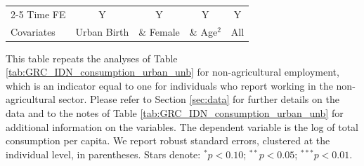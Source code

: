 \begin{table}[htbp]
\begin{threeparttable}
\begin{tabular}{l cccc}
\cmidrule{2-5} Time FE & Y & Y & Y & Y \\ Covariates & Urban Birth & \& Female & \& Age$^2$ & All \\ \bottomrule \end{tabular} \begin{tablenotes}[flushleft] \footnotesize \item{This table repeats the analyses of Table \ref{tab:GRC_IDN_consumption_urban_unb}  for non-agricultural employment, which is an indicator equal to one for individuals who report working in the non-agricultural sector. Please refer to Section \ref{sec:data} for further details on the data and to the notes of Table \ref{tab:GRC_IDN_consumption_urban_unb} for additional information on the variables. The dependent variable is the log of total consumption per capita. We report robust standard errors, clustered at the individual level, in parentheses. Stars denote: $^{*} p<0.10$; $^{**} p<0.05$; $^{***} p<0.01$.} \end{tablenotes} \end{threeparttable} \end{table}
